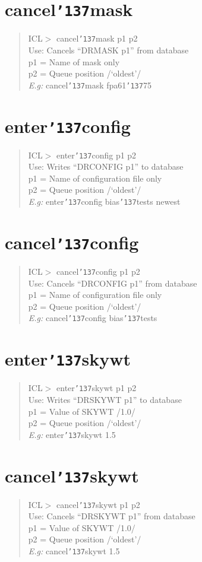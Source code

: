 \documentclass[a4paper]{book}
\renewcommand{\_}{{\tt\char'137}}
\begin{document}
\section{cancel\_mask}
\begin{quote}
ICL$>$ cancel\_mask p1 p2 \\
Use: Cancels ``DRMASK p1'' from database \\
p1 = Name of mask only  \\
p2 = Queue position /`oldest'/ \\
{\em E.g:} cancel\_mask fpa61\_75
\end{quote}
\section{enter\_config}
\begin{quote}
ICL$>$ enter\_config p1 p2 \\
Use: Writes ``DRCONFIG p1'' to database \\
p1 = Name of configuration file only \\
p2 = Queue position /`oldest'/ \\
{\em E.g:} enter\_config bias\_tests newest
\end{quote}
\section{cancel\_config}
\begin{quote}
ICL$>$ cancel\_config p1 p2 \\
Use: Cancels ``DRCONFIG p1'' from database \\
p1 = Name of configuration file only \\
p2 = Queue position /`oldest'/ \\
{\em E.g:} cancel\_config bias\_tests
\end{quote}
\section{enter\_skywt}
\begin{quote}
ICL$>$ enter\_skywt p1 p2 \\
Use: Writes ``DRSKYWT p1'' to database \\
p1 = Value of SKYWT /1.0/ \\
p2 = Queue position /`oldest'/ \\
{\em E.g:} enter\_skywt 1.5
\end{quote}
\section{cancel\_skywt}
\begin{quote}
ICL$>$ cancel\_skywt p1 p2 \\
Use: Cancels ``DRSKYWT p1'' from database \\
p1 = Value of SKYWT /1.0/ \\
p2 = Queue position /`oldest'/ \\
{\em E.g:} cancel\_skywt 1.5
\end{quote}
\end{document}
